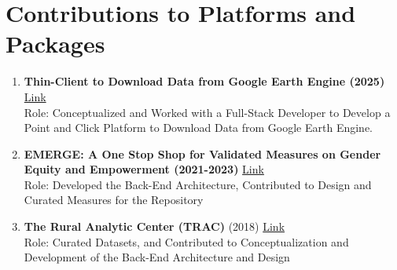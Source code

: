 \documentclass[11pt,letterpaper]{article}
\begin{document}
\section*{Contributions to Platforms and Packages}
\label{sec:org79103bb}
\begin{enumerate}
\item \textbf{Thin-Client to Download Data from Google Earth Engine (2025)} \href{Https://Github.Com/Thrcle421/Thin-Client-For-Google-Earth-Engine}{Link} \\
Role: Conceptualized and Worked with a Full-Stack Developer to Develop a Point and Click Platform to Download Data from Google Earth Engine. 

\item \textbf{EMERGE: A One Stop Shop for Validated Measures on Gender Equity and Empowerment (2021-2023)} \href{Https://Emerge.Ucsd.Edu/}{Link} \\
Role: Developed the Back-End Architecture, Contributed to Design and Curated Measures for the Repository 

\item \textbf{The Rural Analytic Center (TRAC)} (2018) \href{Https://Www.Tracindia.Org/Page/Data-Visualization}{Link} \\
Role: Curated Datasets, and Contributed to Conceptualization and Development of the Back-End Architecture and Design 
\end{enumerate}
\end{document}
